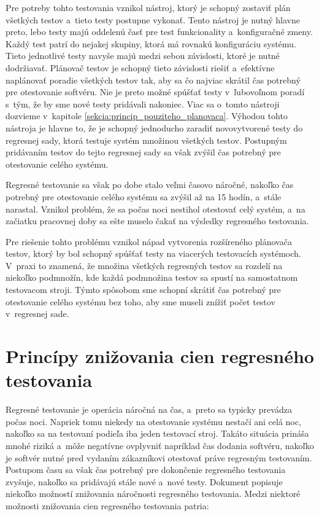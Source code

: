 Pre potreby tohto testovania vznikol nástroj, ktorý je schopný zostaviť 
plán všetkých testov a~tieto testy postupne vykonať. Tento nástroj je
nutný hlavne preto, lebo testy majú oddelenú časť pre
test funkcionality a~konfiguračné zmeny. Každý test patrí do nejakej 
skupiny, ktorá má rovnakú konfiguráciu systému. 
Tieto jednotlivé testy navyše majú medzi sebou závislosti, ktoré je 
nutné dodržiavať. Plánovač testov je schopný tieto závislosti riešiť 
a~efektívne naplánovať poradie všetkých testov tak, aby sa čo najviac 
skrátil čas potrebný pre otestovanie softvéru. Nie je preto možné spúšťať
testy v~ľubovoľnom poradí s~tým, že by sme nové testy pridávali nakoniec.
Viac sa o~tomto nástroji dozvieme v~kapitole
\ref{sekcia:princip_pouziteho_planovaca}.
Výhodou tohto nástroja je hlavne to, že je schopný jednoducho zaradiť 
novovytvorené testy do regresnej sady, ktorá testuje systém množinou 
všetkých testov. Postupným pridávaním testov do tejto regresnej sady sa 
však zvýšil čas potrebný pre otestovanie celého systému.

Regresné testovanie sa však po dobe stalo veľmi časovo náročné, nakoľko 
čas potrebný pre otestovanie celého systému sa zvýšil až na 15 hodín, 
a~stále narastal.
Vznikol problém, že sa počas noci nestihol otestovať celý systém, a~na 
začiatku pracovnej doby sa ešte muselo čakať na výsledky regresného 
testovania. 

Pre riešenie tohto problému vznikol nápad vytvorenia 
rozšíreného plánovača testov, ktorý by bol schopný spúšťať testy na 
viacerých testovacích systémoch.
V~praxi to znamená, že množina všetkých regresných testov sa rozdelí na 
niekoľko podmnožín, kde každá podmnožina testov sa spustí na samostatnom
testovacom stroji. 
Týmto spôsobom sme schopní skrátiť čas potrebný pre otestovanie celého 
systému bez toho, aby sme museli znížiť počet testov v~regresnej sade. 

\section{Princípy znižovania cien regresného testovania}
\label{sekcia:principy_znizovania_cien}
Regresné testovanie je operácia náročná na čas, a~preto sa typicky 
prevádza počas noci. Napriek tomu niekedy na otestovanie systému 
nestačí ani celá noc, nakoľko sa na testovaní podieľa iba jeden testovací 
stroj. Takáto situácia prináša mnohé riziká a~môže negatívne ovplyvniť 
napríklad čas dodania softvéru, nakoľko je softvér nutné pred vydaním 
zákazníkovi otestovať práve regresným testovaním. Postupom času sa však 
čas potrebný pre dokončenie regresného testovania zvyšuje, nakoľko sa 
pridávajú stále nové a~nové testy. Dokument \cite{Parallel_approach} 
popisuje niekoľko možností znižovania náročnosti regresného testovania.
Medzi niektoré možnosti znižovania cien regresného testovania patria:


